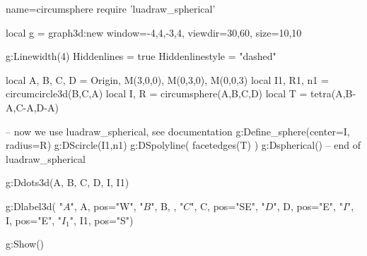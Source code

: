 \documentclass{standalone}
\begin{document}
\begin{luadraw}{name=circumsphere}
require 'luadraw_spherical'

local g = graph3d:new{
  window={-4,4,-3,4},
  viewdir={30,60},
  size={10,10}
}

g:Linewidth(4)
Hiddenlines = true
Hiddenlinestyle = "dashed"

local A, B, C, D = Origin, M(3,0,0), M(0,3,0), M(0,0,3)
local I1, R1, n1 = circumcircle3d(B,C,A)
local I, R = circumsphere(A,B,C,D)
local T = tetra(A,B-A,C-A,D-A)

-- now we use luadraw_spherical, see documentation
g:Define_sphere({center=I, radius=R})
g:DScircle({I1,n1})
g:DSpolyline( facetedges(T) )
g:Dspherical()
-- end of luadraw_spherical

g:Ddots3d({A, B, C, D, I, I1})

g:Dlabel3d(
  "$A$", A, {pos="W"},
  "$B$", B, {},
  "$C$", C, {pos="SE"},
  "$D$", D, {pos="E"},
  "$I$", I, {pos="E"},
  "$I_1$", I1, {pos="S"})

g:Show()
\end{luadraw}
\end{document}
